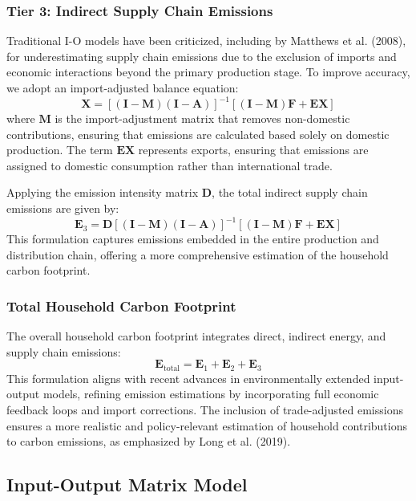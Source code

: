 \documentclass[12pt,a4paper]{article}%
\begin{document}
\subsubsection*{Tier 3: Indirect Supply Chain Emissions}
Traditional I-O models have been criticized, including by Matthews et al. (2008), for underestimating supply chain emissions due to the exclusion of imports and economic interactions beyond the primary production stage. To improve accuracy, we adopt an import-adjusted balance equation:
\begin{equation}
    \mathbf{X} = {[(\mathbf{I} - \mathbf{M}) (\mathbf{I} - \mathbf{A})]}^{-1} [(\mathbf{I} - \mathbf{M}) \mathbf{F} + \mathbf{EX}]
\end{equation}
where \( \mathbf{M} \) is the import-adjustment matrix that removes non-domestic contributions, ensuring that emissions are calculated based solely on domestic production. The term \( \mathbf{EX} \) represents exports, ensuring that emissions are assigned to domestic consumption rather than international trade.

Applying the emission intensity matrix \( \mathbf{D} \), the total indirect supply chain emissions are given by:
\begin{equation}
    \mathbf{E}_3 = \mathbf{D} {[(\mathbf{I} - \mathbf{M}) (\mathbf{I} - \mathbf{A})]}^{-1} [(\mathbf{I} - \mathbf{M}) \mathbf{F} + \mathbf{EX}]
\end{equation}
This formulation captures emissions embedded in the entire production and distribution chain, offering a more comprehensive estimation of the household carbon footprint.

\subsubsection*{Total Household Carbon Footprint}
The overall household carbon footprint integrates direct, indirect energy, and supply chain emissions:
\begin{equation}
    \mathbf{E}_{\text{total}} = \mathbf{E}_1 + \mathbf{E}_2 + \mathbf{E}_3
\end{equation}
This formulation aligns with recent advances in environmentally extended input-output models, refining emission estimations by incorporating full economic feedback loops and import corrections. The inclusion of trade-adjusted emissions ensures a more realistic and policy-relevant estimation of household contributions to carbon emissions, as emphasized by Long et al. (2019).

\subsection{Input-Output Matrix Model}
\end{document}
